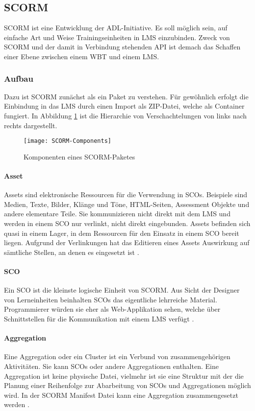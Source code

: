 \subsection{SCORM}\label{ref:scorm}
\ac{SCORM} ist eine Entwicklung der \ac{ADL}-Initiative. Es soll möglich sein,
auf einfache Art und Weise Trainingseinheiten in LMS einzubinden. Zweck von
SCORM und der damit in Verbindung stehenden \ac{API} ist demach das Schaffen einer
Ebene zwischen einem WBT und einem LMS.

\subsubsection{Aufbau}
Dazu ist SCORM zunächst als ein Paket zu verstehen. Für gewöhnlich erfolgt die
Einbindung in das LMS durch einen Import als ZIP-Datei, welche als Container
fungiert. In Abbildung \ref{pic:scormComponents} ist die Hierarchie von
Verschachtelungen von links nach rechts dargestellt.
\begin{figure}[ht]
\centering
\texttt{[image: SCORM-Components]}
\caption{Komponenten eines
SCORM-Paketes\footnotemark}\label{pic:scormComponents}
\end{figure}

\paragraph{Asset}
Assets sind elektronische Ressourcen für die Verwendung in SCOs. Beispiele sind
Medien, Texte, Bilder, Klänge und Töne, \ac{HTML}-Seiten, Assessment Objekte und
andere elementare Teile. Sie kommunizieren nicht direkt mit dem LMS und werden
in einem SCO nur verlinkt, nicht direkt eingebunden. Assets befinden sich quasi
in einem Lager, in dem Ressourcen für den Einsatz in einem SCO bereit liegen.
Aufgrund der Verlinkungen hat das Editieren eines Assets Auswirkung auf
sämtliche Stellen, an denen es eingesetzt ist \cite{adl:2011}.

\paragraph{SCO}
Ein \ac{SCO} ist die kleinste logische Einheit von SCORM. Aus Sicht
der Designer von Lerneinheiten beinhalten SCOs das eigentliche
lehrreiche Material. Programmierer würden sie eher als
Web-Applikation sehen, welche über Schnittstellen für die
Kommunikation mit einem LMS verfügt \cite{adl:2011}.

\paragraph{Aggregation}
Eine Aggregation oder ein Cluster ist ein Verbund von zusammengehörigen
Aktivitäten. Sie kann SCOs oder andere Aggregationen enthalten. Eine Aggregation
ist keine physische Datei, vielmehr ist sie eine Struktur mit der die Planung
einer Reihenfolge zur Abarbeitung von SCOs und Aggregationen möglich wird. In
der SCORM Manifest Datei kann eine Aggregation zusammengesetzt werden
\cite{adl:2011}.

